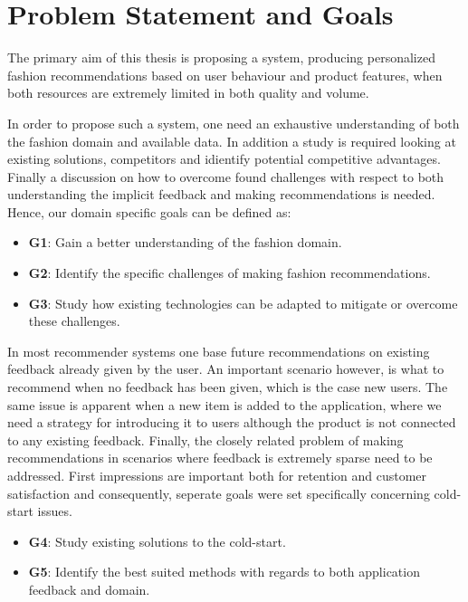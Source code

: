 \section{Problem Statement and Goals}

The primary aim of this thesis is proposing a system, producing personalized
fashion recommendations based on user behaviour and product features, when both
resources are extremely limited in both quality and volume.

In order to propose such a system, one need an exhaustive understanding of both
the fashion domain and available data. In addition a study is required looking
at existing solutions, competitors and idientify potential competitive
advantages. Finally a discussion on how to overcome found challenges with
respect to both understanding the implicit feedback and making recommendations
is needed. Hence, our domain specific goals can be defined as:

\begin{itemize}
	\item \textbf{G1}: Gain a better understanding of the fashion domain.
  \item \textbf{G2}: Identify the specific challenges of making fashion recommendations.
  \item \textbf{G3}: Study how existing technologies can be adapted to mitigate or
  overcome these challenges.
\end{itemize}

In most recommender systems one base future recommendations on existing
feedback already given by the user. An important scenario however, is what to
recommend when no feedback has been given, which is the case new users. The
same issue is apparent when a new item is added to the application, where we
need a strategy for introducing it to users although the product is not
connected to any existing feedback. Finally, the closely related problem of
making recommendations in scenarios where feedback is extremely sparse need to
be addressed. First impressions are important both for retention and customer
satisfaction and consequently, seperate goals were set specifically concerning
cold-start issues.

\begin{itemize}
  \item \textbf{G4}: Study existing solutions to the cold-start.
  \item \textbf{G5}: Identify the best suited methods with regards to both application
  feedback and domain.
\end{itemize}

